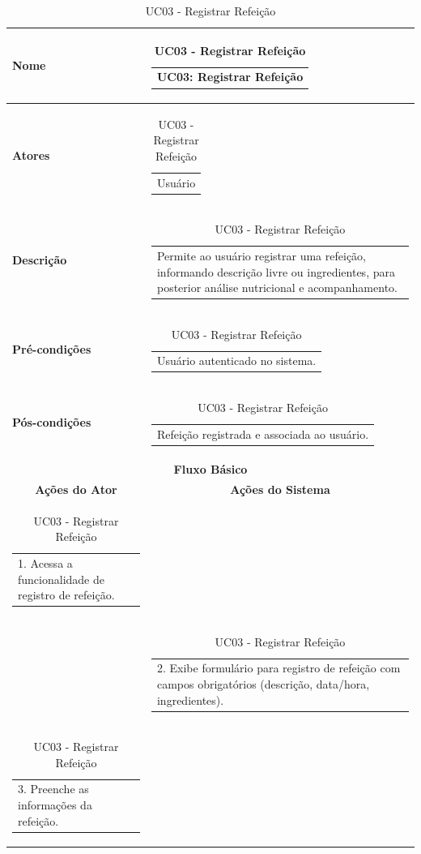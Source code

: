 \begin{longtable}[c]{|p{}|p{}|}
\caption{UC03 - Registrar Refeição}
\label{tab:uc03}\\
\hline
\multicolumn{1}{|p{0.48\textwidth}|}{\textbf{Nome}} &
  \begin{tabular}[c]{@{}p{}@{}}UC03: Registrar Refeição\end{tabular} \\ \hline
\endfirsthead
\endhead
\multicolumn{1}{|p{0.48\textwidth}|}{\textbf{Atores}} &
  \begin{tabular}[c]{@{}p{}@{}}Usuário\end{tabular} \\ \hline
\multicolumn{1}{|p{0.48\textwidth}|}{\textbf{Descrição}} &
  \begin{tabular}[c]{@{}p{}@{}}Permite ao usuário registrar uma refeição, informando descrição livre ou ingredientes, para posterior análise nutricional e acompanhamento.\end{tabular} \\ \hline
\multicolumn{1}{|p{0.48\textwidth}|}{\textbf{Pré-condições}} &
  \begin{tabular}[c]{@{}p{}@{}}Usuário autenticado no sistema.\end{tabular} \\ \hline
\multicolumn{1}{|p{0.48\textwidth}|}{\textbf{Pós-condições}} &
  \begin{tabular}[c]{@{}p{}@{}}Refeição registrada e associada ao usuário.\end{tabular} \\ \hline
\multicolumn{2}{|c|}{\textbf{Fluxo Básico}} \\ \hline
\multicolumn{1}{|c|}{\textbf{Ações do Ator}} &
  \multicolumn{1}{c|}{\textbf{Ações do Sistema}} \\ \hline
\multicolumn{1}{|p{0.48\textwidth}|}{\begin{tabular}[c]{@{}p{}@{}}1. Acessa a funcionalidade de registro de refeição.\end{tabular}} & \\ \hline
\multicolumn{1}{|p{0.48\textwidth}|}{} &
  \begin{tabular}[c]{@{}p{}@{}}2. Exibe formulário para registro de refeição com campos obrigatórios (descrição, data/hora, ingredientes).\end{tabular} \\ \hline
\multicolumn{1}{|p{0.48\textwidth}|}{\begin{tabular}[c]{@{}p{}@{}}3. Preenche as informações da refeição.\end{tabular}} & \\ \hline

\end{longtable}
